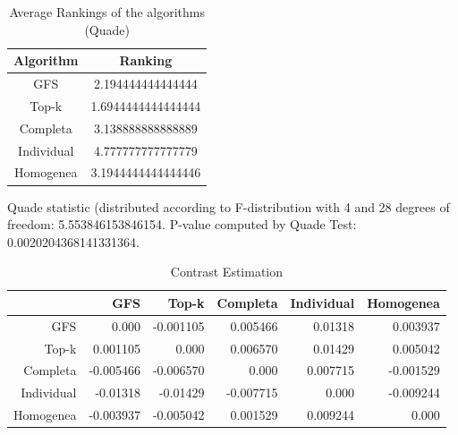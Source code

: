 \documentclass[a4paper,10pt]{article}
\begin{document}
\begin{landscape}
\newpage

\begin{table}[!htp]
\centering
\caption{Average Rankings of the algorithms (Quade)
}\begin{tabular}{c|c}
Algorithm&Ranking\\
\hline
GFS&2.194444444444444\\
Top-k&1.6944444444444444\\
Completa&3.138888888888889\\
Individual&4.777777777777779\\
Homogenea&3.1944444444444446\\
\end{tabular}
\end{table}
Quade statistic (distributed according to F-distribution with 4 and 28 degrees of freedom: 5.553846153846154. 
P-value computed by Quade Test: 0.0020204368141331364.\newline


\newpage

\begin{table}[!htp]
\centering\tiny
\caption{Contrast Estimation}
\begin{tabular}{
|r|r|r|r|r|r|}
\hline
 &GFS&Top-k&Completa&Individual&Homogenea\\
\hline
GFS&0.000&-0.001105&0.005466&0.01318&0.003937\\
\hline
Top-k&0.001105&0.000&0.006570&0.01429&0.005042\\
\hline
Completa&-0.005466&-0.006570&0.000&0.007715&-0.001529\\
\hline
Individual&-0.01318&-0.01429&-0.007715&0.000&-0.009244\\
\hline
Homogenea&-0.003937&-0.005042&0.001529&0.009244&0.000\\
\hline

\end{tabular}
\end{table}

\newpage


\end{landscape}
\end{document}
